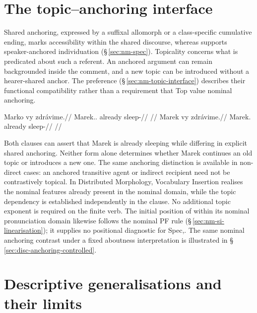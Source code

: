 \section{The topic--anchoring interface}\label{sec:tc-anchoring-interface}

Shared anchoring, expressed by a suffixal allomorph or a class-specific
 cumulative ending, marks accessibility within the shared discourse, whereas
  supports speaker-anchored individuation
 (§\,\ref{sec:nm-spec}). Topicality concerns what is predicated about such
 a referent. An anchored argument can remain backgrounded inside the comment,
 and a new topic can be introduced without a hearer-shared anchor. The
  preference
 (§\,\ref{sec:nm-topic-interface}) describes their functional
 compatibility rather than a requirement that Top value nominal anchoring.

\pex\label{ex:tc-anch-contrast}
\a\label{ex:tc-anch-overt}%
\begingl
\gla Marko vy zdrávime.//
\glb Marek.\Dir{}.\Def{} already sleep-\Prog{}//
\glft {}
      //
\endgl
\a\label{ex:tc-anch-bare}%
\begingl
\gla Marek vy zdrávime.//
\glb Marek.\Dir{} already sleep-\Prog{}//
\glft {}
      //
\endgl
\xe

\noindent Both clauses can assert that Marek is already sleeping while
 differing in explicit shared anchoring. Neither form alone determines
 whether Marek continues an old topic or introduces a new one. The same
 anchoring distinction is available in non-direct cases: an anchored
 transitive agent or indirect recipient need not be contrastively topical.
 In Distributed Morphology, Vocabulary Insertion realises the nominal features
 already present in the nominal domain, while the topic dependency is
 established independently in the clause. No additional topic exponent is
 required on the finite verb. The initial position of  within its
 nominal pronunciation domain likewise follows the nominal PF rule
 (§\,\ref{sec:nm-si-linearisation}); it supplies no positional diagnostic
 for Spec,. The same nominal anchoring contrast under a fixed
 aboutness interpretation is illustrated in
 §\,\ref{sec:disc-anchoring-controlled}.

\section{Descriptive generalisations and their limits}\label{sec:tc-summary}

